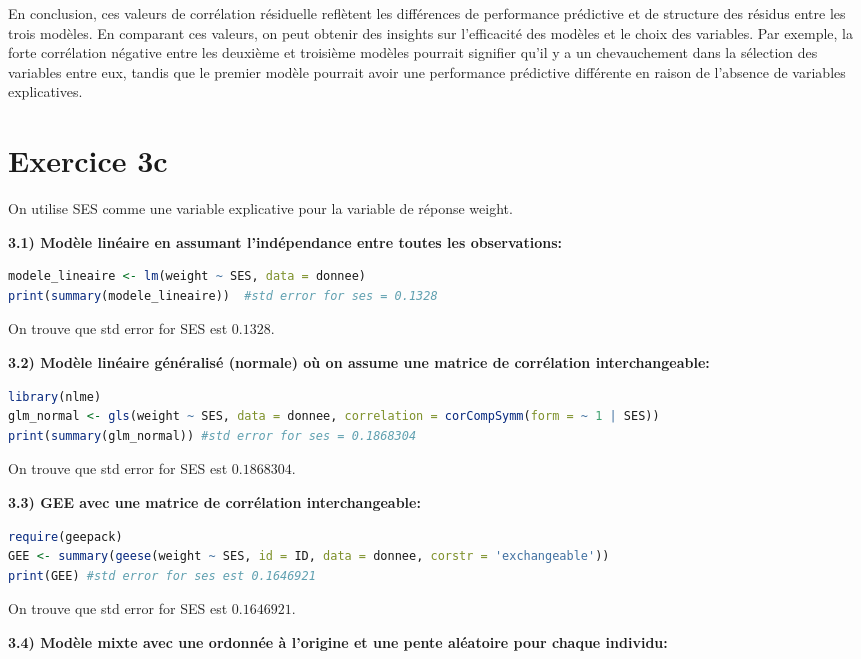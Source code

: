 \documentclass[../main.tex]{subfiles}
\begin{document}
\begin{CJK*}{UTF8}{gbsn}
En conclusion, ces valeurs de corrélation résiduelle reflètent les différences de performance prédictive et de structure des résidus entre les trois modèles. En comparant ces valeurs, on peut obtenir des insights sur l'efficacité des modèles et le choix des variables. Par exemple, la forte corrélation négative entre les deuxième et troisième modèles pourrait signifier qu'il y a un chevauchement dans la sélection des variables entre eux, tandis que le premier modèle pourrait avoir une performance prédictive différente en raison de l'absence de variables explicatives.
   
\section*{Exercice 3c}

On utilise SES comme une variable explicative pour la variable de réponse weight.

\textbf{3.1) Modèle linéaire en assumant l'indépendance entre toutes les observations:}

\begin{lstlisting}[language=R]
modele_lineaire <- lm(weight ~ SES, data = donnee)
print(summary(modele_lineaire))  #std error for ses = 0.1328
\end{lstlisting}

On trouve que std error for SES est $0.1328$.

\textbf{3.2) Modèle linéaire généralisé (normale) où on assume une matrice de corrélation interchangeable:}

\begin{lstlisting}[language=R]
library(nlme)
glm_normal <- gls(weight ~ SES, data = donnee, correlation = corCompSymm(form = ~ 1 | SES))
print(summary(glm_normal)) #std error for ses = 0.1868304
\end{lstlisting}

On trouve que std error for SES est $0.1868304$.

\textbf{3.3) GEE avec une matrice de corrélation interchangeable:}

\begin{lstlisting}[language=R]
require(geepack)
GEE <- summary(geese(weight ~ SES, id = ID, data = donnee, corstr = 'exchangeable'))
print(GEE) #std error for ses est 0.1646921
\end{lstlisting}

On trouve que std error for SES est $0.1646921$.

\textbf{3.4) Modèle mixte avec une ordonnée à l'origine et une pente aléatoire pour chaque individu:}


\end{CJK*}
\end{document}
